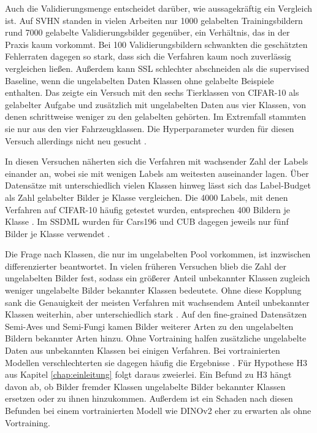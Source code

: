 Auch die Validierungsmenge entscheidet darüber, wie aussagekräftig ein Vergleich ist. Auf SVHN standen in vielen Arbeiten nur 1000 gelabelten Trainingsbildern rund 7000 gelabelte Validierungsbilder gegenüber, ein Verhältnis, das in der Praxis kaum vorkommt. Bei 100 Validierungsbildern schwankten die geschätzten Fehlerraten dagegen so stark, dass sich die Verfahren kaum noch zuverlässig vergleichen ließen. Außerdem kann \ac{SSL} schlechter abschneiden als die supervised Baseline, wenn die ungelabelten Daten Klassen ohne gelabelte Beispiele enthalten. Das zeigte ein Versuch mit den sechs Tierklassen von CIFAR-10 als gelabelter Aufgabe und zusätzlich mit ungelabelten Daten aus vier Klassen, von denen schrittweise weniger zu den gelabelten gehörten. Im Extremfall stammten sie nur aus den vier Fahrzeugklassen. Die Hyperparameter wurden für diesen Versuch allerdings nicht neu gesucht \cite{oliver_realistic_2018}.

In diesen Versuchen näherten sich die Verfahren mit wachsender Zahl der Labels einander an, wobei sie mit wenigen Labels am weitesten auseinander lagen. Über Datensätze mit unterschiedlich vielen Klassen hinweg lässt sich das Label-Budget als Zahl gelabelter Bilder je Klasse vergleichen. Die 4000 Labels, mit denen Verfahren auf CIFAR-10 häufig getestet wurden, entsprechen 400 Bildern je Klasse \cite{oliver_realistic_2018}. Im \ac{SSDML} wurden für Cars196 und \ac{CUB} dagegen jeweils nur fünf Bilder je Klasse verwendet \cite{dutta_semi-supervised_2021, zhuang_deep_2021}.

Die Frage nach Klassen, die nur im ungelabelten Pool vorkommen, ist inzwischen differenzierter beantwortet. In vielen früheren Versuchen blieb die Zahl der ungelabelten Bilder fest, sodass ein größerer Anteil unbekannter Klassen zugleich weniger ungelabelte Bilder bekannter Klassen bedeutete. Ohne diese Kopplung sank die Genauigkeit der meisten Verfahren mit wachsendem Anteil unbekannter Klassen weiterhin, aber unterschiedlich stark \cite{he_reevaluating_2025}. Auf den fine-grained Datensätzen Semi-Aves und Semi-Fungi kamen Bilder weiterer Arten zu den ungelabelten Bildern bekannter Arten hinzu. Ohne Vortraining halfen zusätzliche ungelabelte Daten aus unbekannten Klassen bei einigen Verfahren. Bei vortrainierten Modellen verschlechterten sie dagegen häufig die Ergebnisse \cite{su_realistic_2021}. Für Hypothese H3 aus Kapitel \ref{chap:einleitung} folgt daraus zweierlei. Ein Befund zu H3 hängt davon ab, ob Bilder fremder Klassen ungelabelte Bilder bekannter Klassen ersetzen oder zu ihnen hinzukommen. Außerdem ist ein Schaden nach diesen Befunden bei einem vortrainierten Modell wie DINOv2 eher zu erwarten als ohne Vortraining. 


